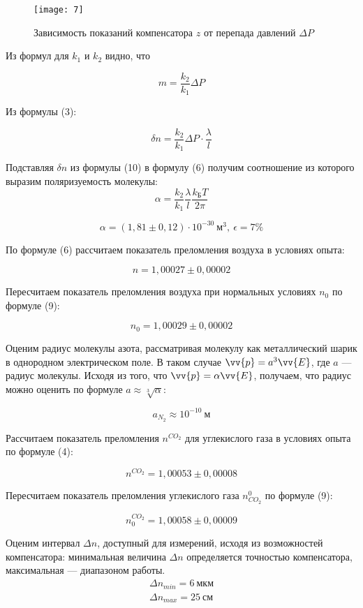 \documentclass[a4paper, 12pt]{article}
\begin{document}
\begin{figure}[H]
    \texttt{[image: 7]} 
    \captionsetup{justification=centering}
    \caption{Зависимость показаний компенсатора $z$ от перепада давлений
    $\Delta P$}
\end{figure}

Из
формул для $k_1$ и $k_2$ видно, что

\[
    m = \frac{k_2}{k_1}\Delta P
\]

Из формулы (3): 

\begin{equation}
    \delta n = \frac{k_2}{k_1}\Delta P \cdot \frac{\lambda}{l}
\end{equation}

Подставляя $\delta n$ из формулы (10) в формулу (6) получим
соотношение из которого выразим поляризуемость молекулы:
\begin{equation}
    \alpha = \frac{k_2}{k_1} \frac{\lambda}{l} \frac{k_\text{Б}T}{2\pi}
\end{equation}

\[
    \alpha = (1,81\pm 0,12)\cdot 10^{-30}\ \text{м}^3, \: \epsilon = 7\%
\]

По формуле (6) рассчитаем показатель преломления воздуха в условиях
опыта:

\[
    n = 1,00027 \pm 0,00002
\]

Пересчитаем показатель преломления воздуха при нормальных условиях
$n_0$ по формуле (9):

\[
    n_0 = 1,00029 \pm 0,00002
\]

Оценим радиус молекулы азота, рассматривая молекулу как металлический
шарик в однородном электрическом поле. В таком случае $\vv{p} = a^3
\vv{E}$, где $a$ --- радиус молекулы. Исходя из того, что $\vv{p} =
\alpha \vv{E}$, получаем, что радиус можно оценить по формуле $a
\approx
\sqrt[3]{\alpha}$:

\[
    a_{N_2} \approx 10^{-10}\ \text{м} 
\]

Рассчитаем показатель преломления $n^{CO_2}$ для углекислого газа в
условиях опыта по формуле (4):

\[
    n^{CO_2} = 1,00053 \pm 0,00008
\]

Пересчитаем показатель преломления углекислого газа $n_{CO_2}^0$ по
формуле (9):

\[
    n_0^{CO_2} = 1,00058 \pm 0,00009
\]

Оценим интервал $\Delta n$, доступный для измерений, исходя из
возможностей компенсатора: минимальная величина $\Delta n$
определяется точностью компенсатора, максимальная --- диапазоном
работы. 
\begin{equation*}
    \begin{gathered}
        \Delta n_{min} = 6\ \text{мкм} \\
        \Delta n_{max} = 25\ \text{см}
    \end{gathered}
\end{equation*}
\end{document}
